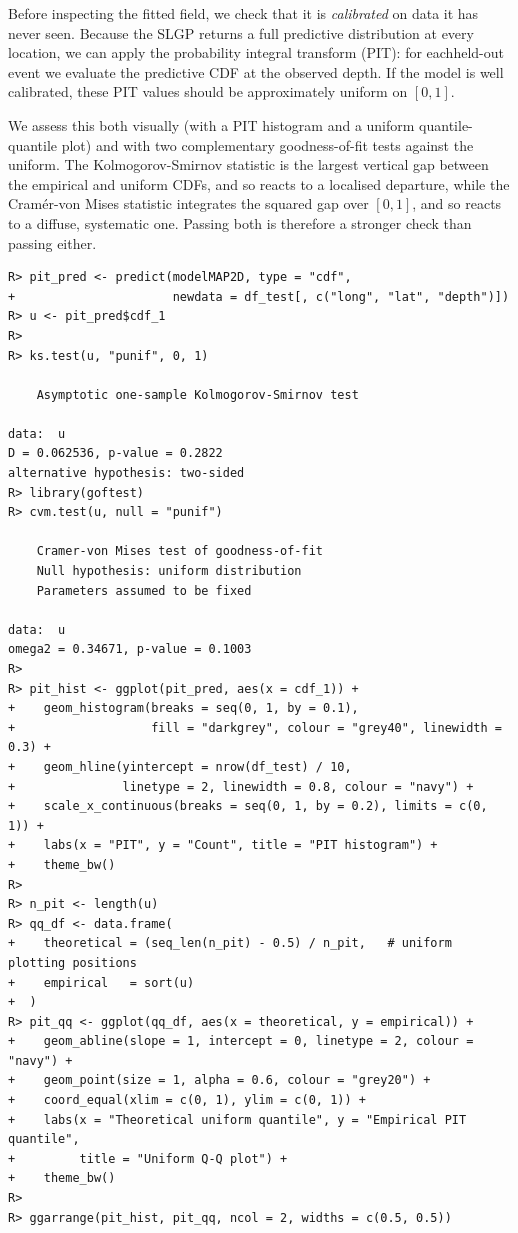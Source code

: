 \documentclass[
]{article}
\begin{document}
Before inspecting the fitted field, we check that it is \emph{calibrated} on data it has never seen. Because the SLGP returns a full predictive distribution at every location, we can apply the probability integral transform (PIT): for eachheld-out event we evaluate the predictive CDF at the observed depth. If the model is well calibrated, these PIT values should be approximately uniform on \([0, 1]\).

We assess this both visually (with a PIT histogram and a uniform quantile-quantile plot) and with two complementary goodness-of-fit tests against the uniform. The Kolmogorov-Smirnov statistic is the largest vertical gap between the empirical and uniform CDFs, and so reacts to a localised departure, while the Cramér-von Mises statistic integrates the squared gap over \([0,1]\), and so reacts to a diffuse,
systematic one. Passing both is therefore a stronger check than passing either.

\begin{verbatim}
R> pit_pred <- predict(modelMAP2D, type = "cdf",
+                      newdata = df_test[, c("long", "lat", "depth")])
R> u <- pit_pred$cdf_1
R> 
R> ks.test(u, "punif", 0, 1)

    Asymptotic one-sample Kolmogorov-Smirnov test

data:  u
D = 0.062536, p-value = 0.2822
alternative hypothesis: two-sided
R> library(goftest)
R> cvm.test(u, null = "punif")

    Cramer-von Mises test of goodness-of-fit
    Null hypothesis: uniform distribution
    Parameters assumed to be fixed

data:  u
omega2 = 0.34671, p-value = 0.1003
R> 
R> pit_hist <- ggplot(pit_pred, aes(x = cdf_1)) +
+    geom_histogram(breaks = seq(0, 1, by = 0.1),
+                   fill = "darkgrey", colour = "grey40", linewidth = 0.3) +
+    geom_hline(yintercept = nrow(df_test) / 10,
+               linetype = 2, linewidth = 0.8, colour = "navy") +
+    scale_x_continuous(breaks = seq(0, 1, by = 0.2), limits = c(0, 1)) +
+    labs(x = "PIT", y = "Count", title = "PIT histogram") +
+    theme_bw()
R> 
R> n_pit <- length(u)
R> qq_df <- data.frame(
+    theoretical = (seq_len(n_pit) - 0.5) / n_pit,   # uniform plotting positions
+    empirical   = sort(u)
+  )
R> pit_qq <- ggplot(qq_df, aes(x = theoretical, y = empirical)) +
+    geom_abline(slope = 1, intercept = 0, linetype = 2, colour = "navy") +
+    geom_point(size = 1, alpha = 0.6, colour = "grey20") +
+    coord_equal(xlim = c(0, 1), ylim = c(0, 1)) +
+    labs(x = "Theoretical uniform quantile", y = "Empirical PIT quantile",
+         title = "Uniform Q-Q plot") +
+    theme_bw()
R> 
R> ggarrange(pit_hist, pit_qq, ncol = 2, widths = c(0.5, 0.5))
\end{verbatim}
\end{document}
